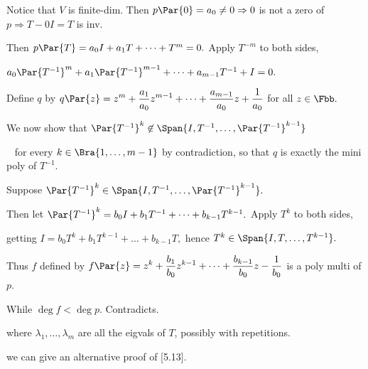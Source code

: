\par\quad
Notice that $V$ is finite-dim. Then $p\Par{0}=a_0\neq 0\Rightarrow 0$ is not a zero of $p\Rightarrow T-0I=T$ is inv.\par\quad
Then $p\Par{T}=a_0 I+a_1 T+\dots+T^m=0.$ Apply $T^{-m}$ to both sides,\par\quad
$a_0\Par{T^{-1}}^m+a_1\Par{T^{-1}}^{m-1}+\dots+a_{m-1}T^{-1}+I=0.$\par\quad
Define $q$ by $\displaystyle q\Par{z}=z^m+\frac{a_1}{a_0} z^{m-1}+\dots+\frac{a_{m-1}}{a_0}z+\frac{1}{a_0}$ for all $z\in\Fbb.$\par\vspace{6pt}\quad
We now show that $\Par{T^{-1}}^k\not\in\Span{I,T^{-1},\dots,\Par{T^{-1}}^{k-1}}$\par\qquad\qquad\qquad\,\,\,
for every $k\in\Bra{1,\dots,m-1}$ by contradiction, so that $q$ is exactly the mini poly of $T^{-1}.$\par\quad
Suppose $\Par{T^{-1}}^k\in\Span{I,T^{-1},\dots,\Par{T^{-1}}^{k-1}}.$\par\quad
Then let $\Par{T^{-1}}^k=b_0 I+b_1 T^{-1}+\dots+b_{k-1}T^{k-1}.$ Apply $T^k$ to both sides,\par\qquad\qquad
 getting $I=b_0 T^k+b_1 T^{k-1}+\dots+b_{k-1}T,$ hence $T^k\in\Span{I,T,\dots,T^{k-1}}.$\par\vspace{6pt}\quad
Thus $f$ defined by $\displaystyle f\Par{z}=z^k+\frac{b_1}{b_0} z^{k-1}+\dots+\frac{b_{k-1}}{b_0} z-\frac{1}{b_0}$ is a poly multi of $p$.\par\quad
While $\deg f<\deg p.$ Contradicts.\PfEnd
\SepLine

\BulletPointX\NoteForSmall{[8.49]}\TextB{}
{\tgsl\large where $\lambda_1,\dots,\lambda_m$ are all the eigvals of $T$, {\tgsc possibly with repetitions}.}\par
\BulletPointX\Comment\TextB{}
we can {\tgsc give an alternative proof of [5.13]}.
\SepLine

